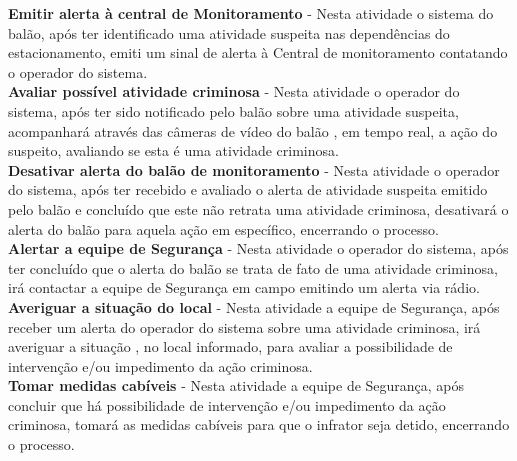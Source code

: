 \textbf{Emitir alerta à central de Monitoramento} - Nesta atividade o sistema do balão, após ter identificado uma atividade suspeita nas dependências do estacionamento, emiti um sinal de alerta à Central de monitoramento contatando o operador do sistema.
\\

\textbf{Avaliar possível atividade criminosa} - Nesta atividade o operador do sistema, após ter sido notificado pelo balão sobre uma atividade suspeita, acompanhará através das câmeras de vídeo do balão , em tempo real, a ação do suspeito, avaliando se esta é uma atividade criminosa.
\\

\textbf{Desativar alerta do balão de monitoramento} - Nesta atividade o operador do sistema, após ter recebido e avaliado o alerta de atividade suspeita emitido pelo balão e concluído que este não retrata uma atividade criminosa, desativará o alerta do balão para aquela ação em específico, encerrando o processo.
\\

\textbf{Alertar a equipe de Segurança} - Nesta atividade o operador do sistema, após ter concluído que o alerta do balão se trata de fato de uma atividade criminosa, irá contactar a equipe de Segurança em campo emitindo um alerta via rádio.
\\

\textbf{Averiguar a situação do local} - Nesta atividade a equipe de Segurança, após receber um alerta do operador do sistema sobre uma atividade criminosa, irá averiguar a situação , no local informado, para avaliar a possibilidade de intervenção e/ou impedimento da ação criminosa.
\\

\textbf{Tomar medidas cabíveis} - Nesta atividade a equipe de Segurança, após concluir que há possibilidade de intervenção e/ou impedimento da ação criminosa, tomará as medidas cabíveis para que o infrator seja detido, encerrando o processo.
\\

